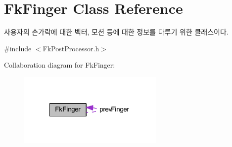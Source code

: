 \hypertarget{class_fk_finger}{}\section{Fk\+Finger Class Reference}
\label{class_fk_finger}


사용자의 손가락에 대한 벡터, 모션 등에 대한 정보를 다루기 위한 클래스이다.  




{\ttfamily \#include $<$Fk\+Post\+Processor.\+h$>$}



Collaboration diagram for Fk\+Finger\+:
\nopagebreak
\begin{figure}[H]
\begin{center}
\leavevmode
\includegraphics[width=200pt]{class_fk_finger__coll__graph}
\end{center}
\end{figure}
